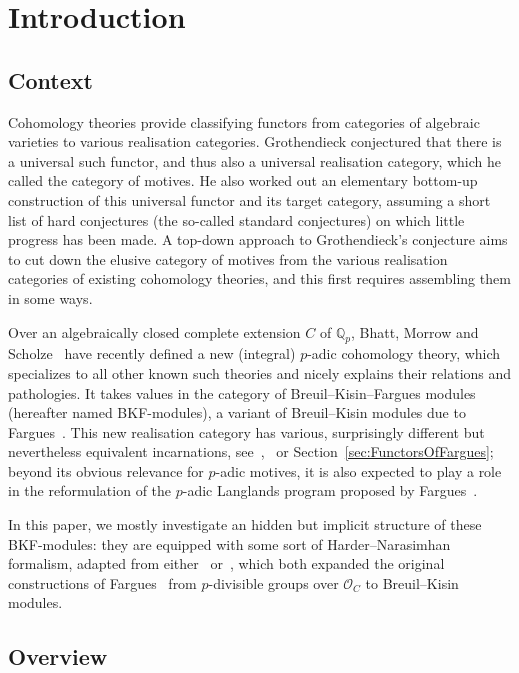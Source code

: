 \documentclass[11pt]{article}
\theoremstyle{definition}
\numberwithin{equation}{section}
\numberwithin{figure}{section}
\numberwithin{table}{section}
\begin{document}
\section{Introduction}

\subsection{Context}

Cohomology theories provide classifying functors from categories of algebraic varieties to various realisation categories. Grothendieck conjectured that there is a universal such functor, and thus also a universal realisation category, which he called the category of motives. He also worked out an elementary bottom-up construction of this universal functor and its target category, assuming a short list of hard conjectures (the so-called standard conjectures) on which little progress has been made. A top-down approach to Grothendieck's conjecture aims to cut down the elusive category of motives from the various realisation categories of existing cohomology theories, and this first requires assembling them in some ways.

Over an algebraically closed complete extension $C$ of $\mathbb{Q}_{p}$, Bhatt, Morrow and Scholze~\cite{BaMoSc16} have recently defined a new (integral) $p$-adic cohomology theory, which specializes to all other known such theories and nicely explains their relations and pathologies. It takes values in the category of Breuil--Kisin--Fargues modules (hereafter named BKF-modules), a variant of Breuil--Kisin modules due to Fargues~\cite{Fa15}. This new realisation category has various, surprisingly different but nevertheless equivalent incarnations, see~\cite[14.1.1]{ScWe15},~\cite[7.5]{Sc17} or Section~\ref{sec:FunctorsOfFargues}; beyond its obvious relevance for $p$-adic motives, it is also expected to play a role in the reformulation of the $p$-adic Langlands program proposed by Fargues~\cite{Fa16}.

In this paper, we mostly investigate an hidden but implicit structure of these BKF-modules: they are equipped with some sort of Harder--Narasimhan formalism, adapted from either~\cite{Imp16} or~\cite{LeWE16}, which both expanded the original constructions of Fargues~\cite{Fa12} from $p$-divisible groups over $\mathcal{O}_{C}$ to Breuil--Kisin modules.

\subsection{Overview}
\end{document}
